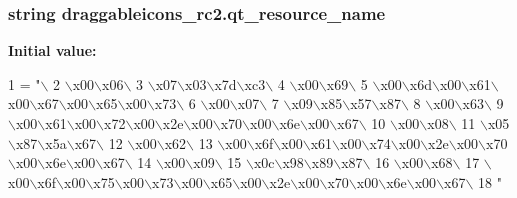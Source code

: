 \subsubsection[{qt\+\_\+resource\+\_\+name}]{\setlength{\rightskip}{0pt plus 5cm}string draggableicons\+\_\+rc2.\+qt\+\_\+resource\+\_\+name}\label{namespacedraggableicons__rc2_ab57702edb5fe33c831f5ef104b6dc2ec}
{\bfseries Initial value\+:}
\begin{DoxyCode}
1 = \textcolor{stringliteral}{"\(\backslash\)}
2 \textcolor{stringliteral}{\(\backslash\)x00\(\backslash\)x06\(\backslash\)}
3 \textcolor{stringliteral}{\(\backslash\)x07\(\backslash\)x03\(\backslash\)x7d\(\backslash\)xc3\(\backslash\)}
4 \textcolor{stringliteral}{\(\backslash\)x00\(\backslash\)x69\(\backslash\)}
5 \textcolor{stringliteral}{\(\backslash\)x00\(\backslash\)x6d\(\backslash\)x00\(\backslash\)x61\(\backslash\)x00\(\backslash\)x67\(\backslash\)x00\(\backslash\)x65\(\backslash\)x00\(\backslash\)x73\(\backslash\)}
6 \textcolor{stringliteral}{\(\backslash\)x00\(\backslash\)x07\(\backslash\)}
7 \textcolor{stringliteral}{\(\backslash\)x09\(\backslash\)x85\(\backslash\)x57\(\backslash\)x87\(\backslash\)}
8 \textcolor{stringliteral}{\(\backslash\)x00\(\backslash\)x63\(\backslash\)}
9 \textcolor{stringliteral}{\(\backslash\)x00\(\backslash\)x61\(\backslash\)x00\(\backslash\)x72\(\backslash\)x00\(\backslash\)x2e\(\backslash\)x00\(\backslash\)x70\(\backslash\)x00\(\backslash\)x6e\(\backslash\)x00\(\backslash\)x67\(\backslash\)}
10 \textcolor{stringliteral}{\(\backslash\)x00\(\backslash\)x08\(\backslash\)}
11 \textcolor{stringliteral}{\(\backslash\)x05\(\backslash\)x87\(\backslash\)x5a\(\backslash\)x67\(\backslash\)}
12 \textcolor{stringliteral}{\(\backslash\)x00\(\backslash\)x62\(\backslash\)}
13 \textcolor{stringliteral}{\(\backslash\)x00\(\backslash\)x6f\(\backslash\)x00\(\backslash\)x61\(\backslash\)x00\(\backslash\)x74\(\backslash\)x00\(\backslash\)x2e\(\backslash\)x00\(\backslash\)x70\(\backslash\)x00\(\backslash\)x6e\(\backslash\)x00\(\backslash\)x67\(\backslash\)}
14 \textcolor{stringliteral}{\(\backslash\)x00\(\backslash\)x09\(\backslash\)}
15 \textcolor{stringliteral}{\(\backslash\)x0c\(\backslash\)x98\(\backslash\)x89\(\backslash\)x87\(\backslash\)}
16 \textcolor{stringliteral}{\(\backslash\)x00\(\backslash\)x68\(\backslash\)}
17 \textcolor{stringliteral}{\(\backslash\)x00\(\backslash\)x6f\(\backslash\)x00\(\backslash\)x75\(\backslash\)x00\(\backslash\)x73\(\backslash\)x00\(\backslash\)x65\(\backslash\)x00\(\backslash\)x2e\(\backslash\)x00\(\backslash\)x70\(\backslash\)x00\(\backslash\)x6e\(\backslash\)x00\(\backslash\)x67\(\backslash\)}
18 \textcolor{stringliteral}{"}
\end{DoxyCode}
\hypertarget{namespacedraggableicons__rc2_a7737c79d3763870f8f145412f679d3e5}{}
